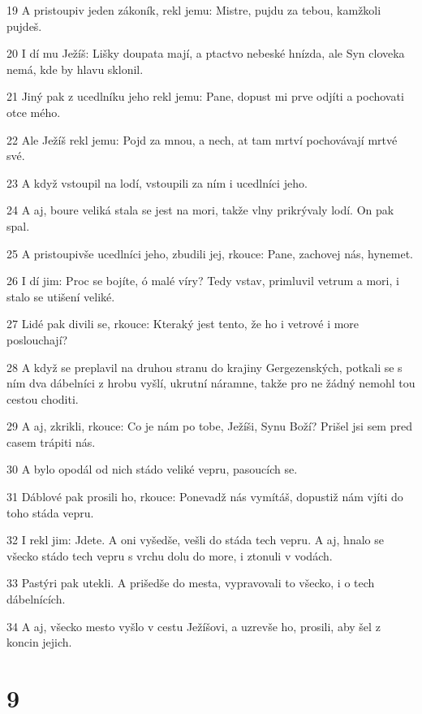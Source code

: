 \par 19 A pristoupiv jeden zákoník, rekl jemu: Mistre, pujdu za tebou, kamžkoli pujdeš.
\par 20 I dí mu Ježíš: Lišky doupata mají, a ptactvo nebeské hnízda, ale Syn cloveka nemá, kde by hlavu sklonil.
\par 21 Jiný pak z ucedlníku jeho rekl jemu: Pane, dopust mi prve odjíti a pochovati otce mého.
\par 22 Ale Ježíš rekl jemu: Pojd za mnou, a nech, at tam mrtví pochovávají mrtvé své.
\par 23 A když vstoupil na lodí, vstoupili za ním i ucedlníci jeho.
\par 24 A aj, boure veliká stala se jest na mori, takže vlny prikrývaly lodí. On pak spal.
\par 25 A pristoupivše ucedlníci jeho, zbudili jej, rkouce: Pane, zachovej nás, hynemet.
\par 26 I dí jim: Proc se bojíte, ó malé víry? Tedy vstav, primluvil vetrum a mori, i stalo se utišení veliké.
\par 27 Lidé pak divili se, rkouce: Kteraký jest tento, že ho i vetrové i more poslouchají?
\par 28 A když se preplavil na druhou stranu do krajiny Gergezenských, potkali se s ním dva dábelníci z hrobu vyšlí, ukrutní náramne, takže pro ne žádný nemohl tou cestou choditi.
\par 29 A aj, zkrikli, rkouce: Co je nám po tobe, Ježíši, Synu Boží? Prišel jsi sem pred casem trápiti nás.
\par 30 A bylo opodál od nich stádo veliké vepru, pasoucích se.
\par 31 Dáblové pak prosili ho, rkouce: Ponevadž nás vymítáš, dopustiž nám vjíti do toho stáda vepru.
\par 32 I rekl jim: Jdete. A oni vyšedše, vešli do stáda tech vepru. A aj, hnalo se všecko stádo tech vepru s vrchu dolu do more, i ztonuli v vodách.
\par 33 Pastýri pak utekli. A prišedše do mesta, vypravovali to všecko, i o tech dábelnících.
\par 34 A aj, všecko mesto vyšlo v cestu Ježíšovi, a uzrevše ho, prosili, aby šel z koncin jejich.

\chapter{9}

